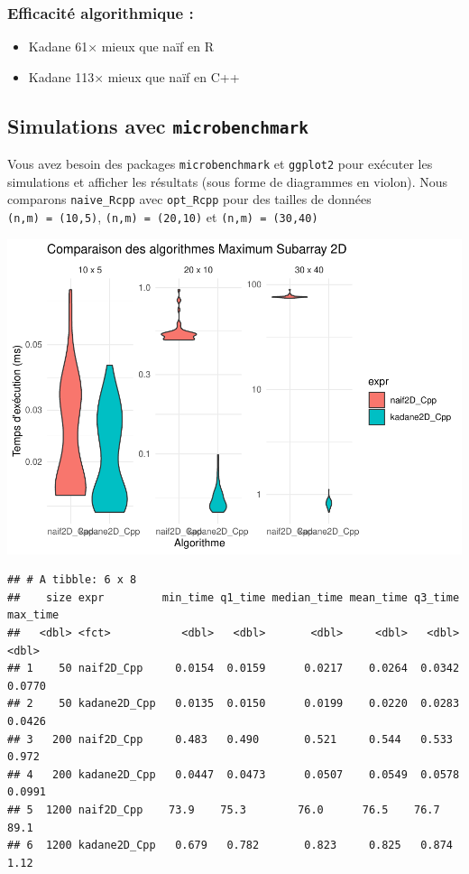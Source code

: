 \documentclass[
]{article}
\begin{document}
\subsubsection{Efficacité algorithmique
:}\label{efficacituxe9-algorithmique}

\begin{itemize}
\item
  Kadane 61× mieux que naïf en R\\
\item
  Kadane 113× mieux que naïf en C++
\end{itemize}

\subsection{\texorpdfstring{Simulations avec
\texttt{microbenchmark}}{Simulations avec microbenchmark}}\label{simulations-avec-microbenchmark}

Vous avez besoin des packages \texttt{microbenchmark} et
\texttt{ggplot2} pour exécuter les simulations et afficher les résultats
(sous forme de diagrammes en violon). Nous comparons
\texttt{naive\_Rcpp} avec \texttt{opt\_Rcpp} pour des tailles de données
\texttt{(n,m)\ =\ (10,5)}, \texttt{(n,m)\ =\ (20,10)} et
\texttt{(n,m)\ =\ (30,40)}

\includegraphics{MaxSubarray2D_files/figure-latex/benchmark-1.pdf}

\begin{verbatim}
## # A tibble: 6 x 8
##    size expr         min_time q1_time median_time mean_time q3_time max_time
##   <dbl> <fct>           <dbl>   <dbl>       <dbl>     <dbl>   <dbl>    <dbl>
## 1    50 naif2D_Cpp     0.0154  0.0159      0.0217    0.0264  0.0342   0.0770
## 2    50 kadane2D_Cpp   0.0135  0.0150      0.0199    0.0220  0.0283   0.0426
## 3   200 naif2D_Cpp     0.483   0.490       0.521     0.544   0.533    0.972 
## 4   200 kadane2D_Cpp   0.0447  0.0473      0.0507    0.0549  0.0578   0.0991
## 5  1200 naif2D_Cpp    73.9    75.3        76.0      76.5    76.7     89.1   
## 6  1200 kadane2D_Cpp   0.679   0.782       0.823     0.825   0.874    1.12
\end{verbatim}
\end{document}
